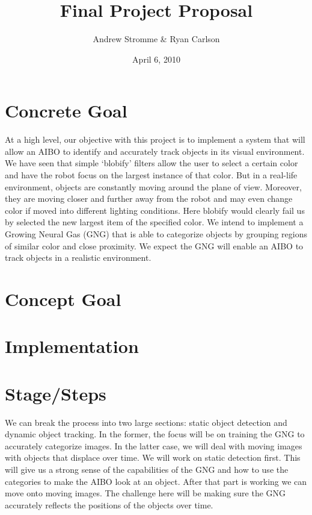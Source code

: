 \documentclass{article}
\begin{document}
\title{Final Project Proposal}
\author{Andrew Stromme \& Ryan Carlson}
\date{April 6, 2010}
\maketitle

\section{Concrete Goal}

At a high level, our objective with this project is to implement a system that will allow an AIBO to identify and accurately track objects in its visual environment. We have seen that simple `blobify' filters allow the user to select a certain color and have the robot focus on the largest instance of that color. But in a real-life environment, objects are constantly moving around the plane of view. Moreover, they are moving closer and further away from the robot and may even change color if moved into different lighting conditions. Here blobify would clearly fail us by selected the new largest item of the specified color. We intend to implement a Growing Neural Gas (GNG) that is able to categorize objects by grouping regions of similar color and close proximity. We expect the GNG will enable an AIBO to track objects in a realistic environment.

\section{Concept Goal}

\section{Implementation}

\section{Stage/Steps}

We can break the process into two large sections: static object detection and dynamic object tracking. In the former, the focus will be on training the GNG to accurately categorize images. In the latter case, we will deal with moving images with objects that displace over time. We will work on static detection first. This will give us a strong sense of the capabilities of the GNG and how to use the categories to make the AIBO look at an object. After that part is working we can move onto moving images. The challenge here will be making sure the GNG accurately reflects the positions of the objects over time.
\end{document}
